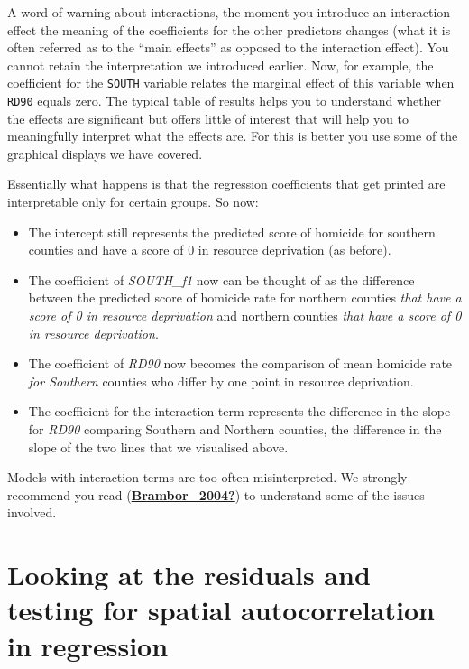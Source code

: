 \documentclass[
  krantz2]{krantz}
\begin{document}
A word of warning about interactions, the moment you introduce an interaction effect the meaning of the coefficients for the other predictors changes (what it is often referred as to the ``main effects'' as opposed to the interaction effect). You cannot retain the interpretation we introduced earlier. Now, for example, the coefficient for the \texttt{SOUTH} variable relates the marginal effect of this variable when \texttt{RD90} equals zero. The typical table of results helps you to understand whether the effects are significant but offers little of interest that will help you to meaningfully interpret what the effects are. For this is better you use some of the graphical displays we have covered.

Essentially what happens is that the regression coefficients that get printed are interpretable only for certain groups. So now:

\begin{itemize}
\item
  The intercept still represents the predicted score of homicide for southern counties and have a score of 0 in resource deprivation (as before).
\item
  The coefficient of \emph{SOUTH\_f1} now can be thought of as the difference between the predicted score of homicide rate for northern counties \emph{that have a score of 0 in resource deprivation} and northern counties \emph{that have a score of 0 in resource deprivation}.
\item
  The coefficient of \emph{RD90} now becomes the comparison of mean homicide rate \emph{for Southern} counties who differ by one point in resource deprivation.
\item
  The coefficient for the interaction term represents the difference in the slope for \emph{RD90} comparing Southern and Northern counties, the difference in the slope of the two lines that we visualised above.
\end{itemize}

Models with interaction terms are too often misinterpreted. We strongly recommend you read (\protect\hyperlink{ref-Brambor_2004}{\textbf{Brambor\_2004?}}) to understand some of the issues involved.

\hypertarget{looking-at-the-residuals-and-testing-for-spatial-autocorrelation-in-regression}{%
\section{Looking at the residuals and testing for spatial autocorrelation in regression}\label{looking-at-the-residuals-and-testing-for-spatial-autocorrelation-in-regression}}
\end{document}
